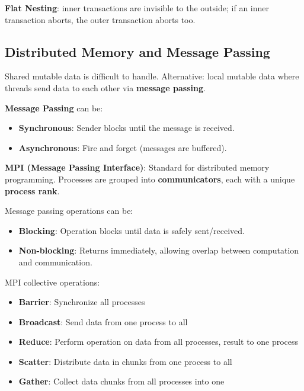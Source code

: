 \begin{definition}
\textbf{Flat Nesting}: inner transactions are invisible to the outside; if an inner transaction aborts, the outer transaction aborts too.
\end{definition}

\subsection{Distributed Memory and Message Passing}

\begin{remark}
Shared mutable data is difficult to handle. Alternative: local mutable data where threads send data to each other via \textbf{message passing}.
\end{remark}

\begin{definition}
\textbf{Message Passing} can be:
\begin{itemize}
    \item \textbf{Synchronous}: Sender blocks until the message is received.
    \item \textbf{Asynchronous}: Fire and forget (messages are buffered).
\end{itemize}
\end{definition}

\begin{definition}
\textbf{MPI (Message Passing Interface)}: Standard for distributed memory programming. Processes are grouped into \textbf{communicators}, each with a unique \textbf{process rank}.
\end{definition}

\begin{definition}
Message passing operations can be:
\begin{itemize}
    \item \textbf{Blocking}: Operation blocks until data is safely sent/received.
    \item \textbf{Non-blocking}: Returns immediately, allowing overlap between computation and communication.
\end{itemize}
\end{definition}

\begin{definition}
MPI collective operations:
\begin{itemize}
    \item \textbf{Barrier}: Synchronize all processes
    \item \textbf{Broadcast}: Send data from one process to all
    \item \textbf{Reduce}: Perform operation on data from all processes, result to one process
    \item \textbf{Scatter}: Distribute data in chunks from one process to all
    \item \textbf{Gather}: Collect data chunks from all processes into one
\end{itemize}
\end{definition}

